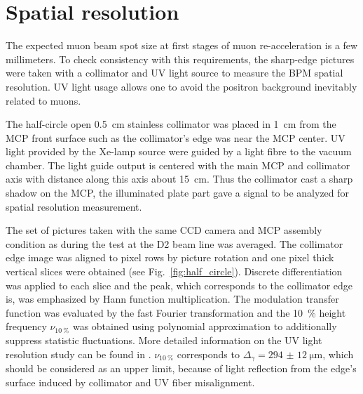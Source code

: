 \documentclass[preprint,3p,twocolumn]{elsarticle}
\begin{document}
\section{Spatial resolution}
 
The expected muon beam spot size at first stages of muon re-acceleration is a few millimeters.
To check consistency with this requirements, the sharp-edge pictures were taken with a collimator and UV light source to measure the BPM spatial resolution.
UV light usage allows one to avoid the positron background inevitably related to muons.

The half-circle open \SI{.5}{\cm} stainless collimator was placed in \SI{1}{\cm} from the MCP front surface
such as the collimator's edge was near the MCP center.
UV light provided by the Xe-lamp source were guided by a light fibre to the vacuum chamber.
The light guide output is centered with the main MCP and collimator axis
with distance along this axis about \SI{15}{\cm}.
Thus the collimator cast a sharp shadow on the MCP,
the illuminated plate part gave a signal to be analyzed for spatial resolution measurement.

The set of pictures taken with the same CCD camera and MCP assembly condition as during the test at the D2 beam line was averaged.
The collimator edge image was aligned to pixel rows by picture rotation and 
one pixel thick vertical slices were obtained (see Fig.~\ref{fig:half_circle}).
Discrete differentiation was applied to each slice  and the peak,
which corresponds to the collimator edge is,
was emphasized by Hann function multiplication.
The modulation transfer function was evaluated by the fast Fourier transformation and
the \SI{10}{\percent} height frequency $\nu_{\SI{10}{\percent}}$ was obtained using polynomial approximation to additionally suppress statistic fluctuations.
More detailed information on the UV light resolution study can be found in \cite{Gosha}.
$\nu_{\SI{10}{\percent}}$ corresponds to $\Delta_\gamma = \SI{294(12)}{\um}$,
which should be considered as an upper limit,
because of light reflection from the edge's surface induced by collimator and UV fiber misalignment.
\end{document}
